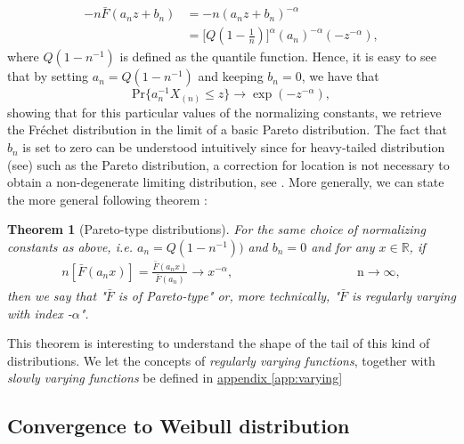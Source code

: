 \documentclass[11pt,a4paper,openany ]{book}
\newtheorem{theorem}{Theorem}[chapter]
\begin{document}
\begin{equation*}
\begin{aligned}
-n\bar{F}(a_nz+b_n)
& =-n(a_nz+b_n)^{-\alpha} \\
& =\Big[Q(1-\frac{1}{n})\Big]^{\alpha}(a_n)^{-\alpha}(-z^{-\alpha}),
\end{aligned}
\end{equation*}
where $Q(1-n^{-1})$ is defined as the quantile function. Hence, it is easy to see that by setting $a_n=Q(1-n^{-1})$ and keeping $b_n=0$, we have that 
\begin{equation*}
\text{Pr}\{a_n^{-1}X_{(n)}\leq z\}\rightarrow \exp (-z^{-\alpha}),
\end{equation*}
showing that for this particular values of the normalizing constants, we retrieve the Fréchet distribution in the limit of a basic Pareto distribution. The fact that $b_n$ is set to zero can be understood intuitively since for heavy-tailed distribution (see) such as the Pareto distribution, a correction for location is not necessary to obtain a non-degenerate limiting distribution, see \citet[pp.51]{beirlant_practical_1996}.
More generally, we can state the more general following theorem :
\begin{theorem}[Pareto-type distributions] For the same choice of normalizing constants as above, i.e. $a_n=Q(1-n^{-1}))$ and $b_n=0$ and for any $x\in\mathbb{R}$, if
	\begin{equation}
	\begin{aligned}
	n[\bar{F}(a_nx)]= \frac{\bar{F}(a_nx)}{\bar{F}(a_n)}\rightarrow x^{-\alpha} ,&&&&&&&&&&&& \text{ n}\to\infty,
	\end{aligned}
	\end{equation}
	then we say that "\emph{$\bar{F}$ is of Pareto-type}" or, more technically, "\emph{$\bar{F}$ is regularly varying with index -$\alpha$}".
\end{theorem}

This theorem is interesting to understand the shape of the tail of this kind of distributions. 
We let the concepts of \emph{regularly varying functions}, together with \emph{slowly varying functions} be defined in \hyperref[app:varying]{appendix \ref{app:varying}}

\subsection*{Convergence to Weibull distribution}
\end{document}
